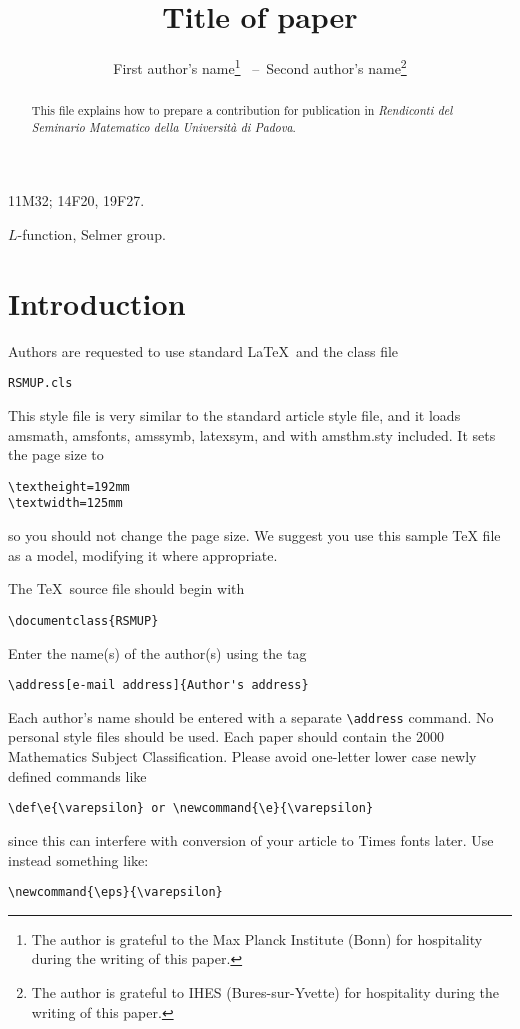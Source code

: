 \documentclass{RSMUP}
\title[Title of paper]{Title of paper}
\author[First author's name \ --\  Second author's name]{First author's name\thanks{The author is grateful to
the Max Planck Institute (Bonn) for hospitality during the writing of
this paper.} \ --\ Second author's name\thanks{The author is grateful to
IHES (Bures-sur-Yvette) for hospitality during the writing of
this paper.}}
\theoremstyle{definition}
\newcommand{\eps}{\varepsilon}	 %
\begin{document}
\maketitle



\begin{abstract}
This file explains how to prepare a contribution for publication in
\textit{Rendiconti del Seminario Matematico della Universit\`a di Padova}.
\end{abstract}

\begin{classification}
11M32; 14F20,  19F27.
\end{classification}

\begin{keywords}
$L$-function,  Selmer group.
\end{keywords}






\section{Introduction}
Authors are requested to use  standard \LaTeX\ and the class file
\begin{verbatim}
RSMUP.cls
\end{verbatim}
This style file is very similar to the standard article style file, and it loads amsmath,
amsfonts, amssymb, latexsym, and with amsthm.sty included. It sets the page size to
\begin{verbatim}
\textheight=192mm
\textwidth=125mm
\end{verbatim}
so you should not change the page size. We suggest you use this sample TeX file as a model,
modifying it where appropriate.

The \TeX\ source file should begin with
\begin{verbatim}
\documentclass{RSMUP}
\end{verbatim}
Enter the name(s) of the author(s) using the tag
\begin{verbatim}
\address[e-mail address]{Author's address}
\end{verbatim}
Each author's name should be entered with a separate \verb+\+{\tt address} command.
No personal style files should be used. Each paper should contain the 2000 Mathematics
Subject Classification.  Please avoid one-letter lower case newly defined commands like
\begin{verbatim}
\def\e{\varepsilon} or \newcommand{\e}{\varepsilon}
\end{verbatim}
since this can interfere with conversion of your article to Times fonts later. Use instead something
like:
\begin{verbatim}
\newcommand{\eps}{\varepsilon}
\end{verbatim}
\end{document}
